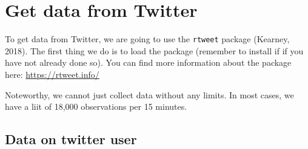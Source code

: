 \documentclass[12pt,oneside]{reedthesis}
\theoremstyle{definition}
\theoremstyle{definition}
\theoremstyle{definition}
\theoremstyle{remark}
\begin{document}
  \section{Get data from Twitter}\label{get-data-from-twitter}
  
  To get data from Twitter, we are going to use the \texttt{rtweet}
  package (Kearney, 2018). The first thing we do is to load the package
  (remember to install if if you have not already done so). You can find
  more information about the package here: \url{https://rtweet.info/}
  \begin{Shaded}
  \begin{Highlighting}[]
  \NormalTok{(}\NormalTok{)}
  \end{Highlighting}
  \end{Shaded}
  Noteworthy, we cannot just collect data without any limits. In most
  cases, we have a liit of 18,000 observations per 15 minutes.
  
  \subsection{Data on twitter user}\label{data-on-twitter-user}
  
\end{document}
